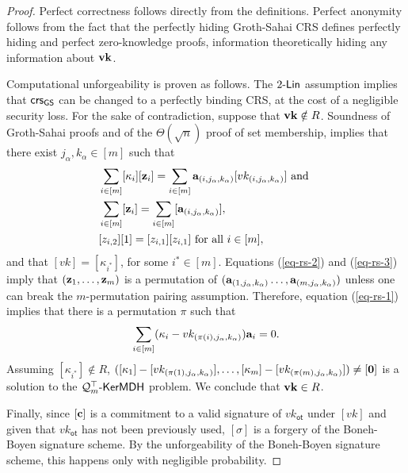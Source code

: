 \begin{proof}
Perfect correctness follows directly from the definitions. Perfect anonymity follows from the fact that the perfectly hiding Groth-Sahai CRS defines perfectly hiding and perfect zero-knowledge proofs, information theoretically hiding any information about $\mathbf{vk}$.

Computational unforgeability is proven as follows. The $2\mbox{-}\mathsf{Lin}$ assumption implies that $\mathsf{crs}_{\mathsf{GS}}$ can be changed to a perfectly binding CRS, at the cost of a negligible security loss. For the sake of contradiction, suppose that $\mathbf{vk}\notin R$. Soundness of Groth-Sahai proofs and of the $\Theta(\sqrt{n})$ proof of set membership, implies that there exist $j_\alpha,k_\alpha\in[m]$ such that
\begin{align}
&\sum_{i\in[m]}[\kappa_i][\mathbf{z}_i]=\sum_{i\in[m]}\mathbf{a}_{(i,j_\alpha,k_\alpha)}[vk_{(i,j_\alpha,k_\alpha)}]\text{ and }\label{eq-rs-1}\\
&\sum_{i\in[m]}[\mathbf{z}_i]=\sum_{i\in[m]}[\mathbf{a}_{(i,j_\alpha,k_\alpha)}], \label{eq-rs-2}\\
&[z_{i,2}][1]=[z_{i,1}][z_{i,1}] \text{ for all }i\in[m],\label{eq-rs-3}
\end{align}
and that $[vk]=[\kappa_{i^*}]$, for some $i^*\in[m]$. Equations (\ref{eq-rs-2}) and (\ref{eq-rs-3}) imply that $(\mathbf{z}_1,\ldots,\mathbf{z}_m)$ is a permutation of $(\mathbf{a}_{(1,j_\alpha,k_\alpha)}\ldots,\mathbf{a}_{(m,j_\alpha,k_\alpha)})$ unless one can break the $m$-permutation pairing assumption. Therefore, equation (\ref{eq-rs-1}) implies that there is a permutation $\pi$ such that
\begin{align}
\sum_{i\in[m]}(\kappa_i-vk_{(\pi(i),j_\alpha,k_\alpha)})\mathbf{a}_i=0.
\end{align}
Assuming $[\kappa_{i^*}]\notin R$, $([\kappa_1]-[vk_{(\pi(1),j_\alpha,k_\alpha)}],\ldots,[\kappa_m]-[vk_{(\pi(m),j_\alpha,k_\alpha)}])\neq [\mathbf{0}]$ is a solution to the $\mathcal{Q}_m^\top\mbox{-}\mathsf{KerMDH}$ problem. We conclude that $\mathbf{vk}\in R$.

Finally, since $[\mathbf{c}]$ is a commitment to a valid signature of $vk_\mathsf{ot}$ under $[vk]$ and given that $vk_\mathsf{ot}$ has not been previously used, $[\sigma]$ is a forgery of the Boneh-Boyen signature scheme. By the unforgeability of the Boneh-Boyen signature scheme, this happens only with negligible probability.
\end{proof}
